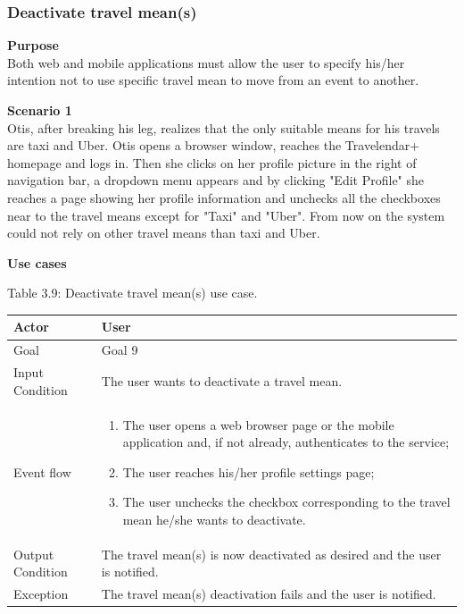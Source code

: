 \documentclass{article}
\begin{document}
	\subsubsection{Deactivate travel mean(s)}
	
	\bigskip
	\noindent
	\textbf{Purpose} \\
	Both web and mobile applications must allow the user to specify his/her intention not to use specific travel mean to move from an event to another.
	
	\bigskip
	\noindent
	\textbf{Scenario 1} \\
	Otis, after breaking his leg, realizes that the only suitable means for his travels are taxi and Uber. Otis opens a browser window, reaches the Travelendar+ homepage and logs in. Then she clicks on her profile picture in the right of navigation bar, a dropdown menu appears and by clicking "Edit Profile" she reaches a page showing her profile information and unchecks all the checkboxes near to the travel means except for "Taxi" and "Uber". From now on the system could not rely on other travel means than taxi and Uber.
	
	\bigskip
	\noindent
	\textbf{Use cases} \\
	
	\begin{center}
		Table 3.9: Deactivate travel mean(s) use case.
		
		\bigskip
    		\begin{tabular}{p{}|p{}}
   		 	\hline
    			Actor & User \\ \hline
    			Goal & Goal 9 \\ \hline
    			Input Condition & The user wants to deactivate a travel mean. \\ \hline
    			Event flow & 
			\begin{enumerate}
  				\item The user opens a web browser page or the mobile application and, if not already, authenticates to the service;
  				\item The user reaches his/her profile settings page;
  				\item The user unchecks the checkbox corresponding to the travel mean he/she wants to deactivate.
 			 \end{enumerate} \\ \hline
    			Output Condition & The travel mean(s) is now deactivated as desired and the user is notified. \\ \hline
    			Exception & The travel mean(s) deactivation fails and the user is notified. \\ \hline
    		\end{tabular}
	\end{center}
	
\end{document}
